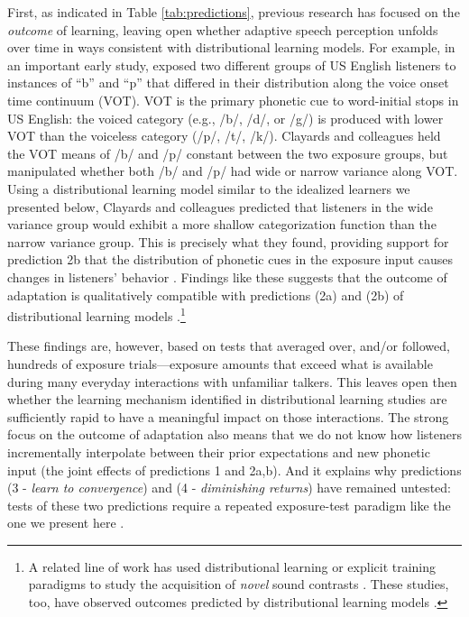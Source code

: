 \documentclass[
  11pt,
  man,mask,floatsintext]{apa6}
\begin{document}
First, as indicated in Table \ref{tab:predictions}, previous research has focused on the \emph{outcome} of learning, leaving open whether adaptive speech perception unfolds over time in ways consistent with distributional learning models. For example, in an important early study, \textcite{clayards2008} exposed two different groups of US English listeners to instances of ``b'' and ``p'' that differed in their distribution along the voice onset time continuum (VOT). VOT is the primary phonetic cue to word-initial stops in US English: the voiced category (e.g., /b/, /d/, or /g/) is produced with lower VOT than the voiceless category (/p/, /t/, /k/). Clayards and colleagues held the VOT means of /b/ and /p/ constant between the two exposure groups, but manipulated whether both /b/ and /p/ had wide or narrow variance along VOT. Using a distributional learning model similar to the idealized learners we presented below, Clayards and colleagues predicted that listeners in the wide variance group would exhibit a more shallow categorization function than the narrow variance group. This is precisely what they found, providing support for prediction 2b that the distribution of phonetic cues in the exposure input causes changes in listeners' behavior \autocites[see also][]{nixon2016,theodore-monto2019}. Findings like these suggests that the outcome of adaptation is qualitatively compatible with predictions (2a) and (2b) of distributional learning models \autocites[see also][]{hitczenko-feldman2016,tan2021,xie2021cognition}.\footnote{A related line of work has used distributional learning or explicit training paradigms to study the acquisition of \emph{novel} sound contrasts \autocites[e.g.,][]{maye2002,mcclelland1999,pajak-levy2012,pisoni1982}. These studies, too, have observed outcomes predicted by distributional learning models \autocite[for review, see][]{pajak2016}.}

These findings are, however, based on tests that averaged over, and/or followed, hundreds of exposure trials---exposure amounts that exceed what is available during many everyday interactions with unfamiliar talkers. This leaves open then whether the learning mechanism identified in distributional learning studies are sufficiently rapid to have a meaningful impact on those interactions. The strong focus on the outcome of adaptation also means that we do not know how listeners incrementally interpolate between their prior expectations and new phonetic input (the joint effects of predictions 1 and 2a,b). And it explains why predictions (3 - \emph{learn to convergence}) and (4 - \emph{diminishing returns}) have remained untested: tests of these two predictions require a repeated exposure-test paradigm like the one we present here \autocites[for discussion, see][]{cummings-theodore2023,kleinschmidt2020}.
\end{document}
